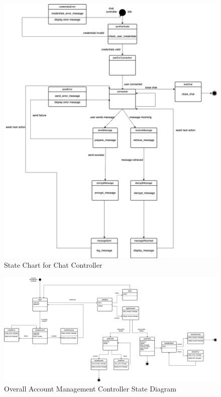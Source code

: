 \documentclass[]{article}
\begin{document}
\begin{figure}[H]
	\centering
	\includegraphics[width=1\textwidth]{chat__controller.drawio.png}
	\caption{State Chart for Chat Controller}
  \label{fig:chat-controller}
\end{figure}

\renewcommand{\thefigure}{2.\arabic{figure}}
\begin{figure}[H]
	\centering
	\includegraphics[scale=0.25]{account-controller.jpg}
	\caption{Overall Account Management Controller State Diagram}
	\label{fig:account-controller}
\end{figure}
\end{document}
